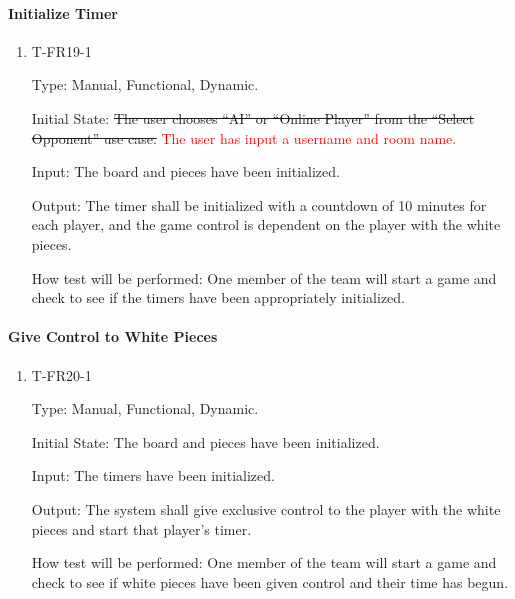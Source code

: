 \documentclass[12pt, titlepage]{article}
\begin{document}
    \paragraph{Initialize Timer}

        \begin{enumerate}

        \item{T-FR19-1\\}

            Type: Manual, Functional, Dynamic.
            					
            Initial State: \sout{The user chooses ``AI'' or ``Online Player'' from the ``Select Opponent'' use case.}
            \textcolor{red}{The user has input a username and room name.}
            
            Input: The board and pieces have been initialized.
            					
            Output: The timer shall be initialized with a countdown of 10 minutes for each player, and the game control is dependent on the player with the white pieces.

            How test will be performed: One member of the team will start a game and check to see if the timers have been appropriately initialized.

        \end{enumerate}

    \paragraph{Give Control to White Pieces}

        \begin{enumerate}

        \item{T-FR20-1\\}

            Type: Manual, Functional, Dynamic.
            					
            Initial State: The board and pieces have been initialized.
            					
            Input: The timers have been initialized.
            					
            Output: The system shall give exclusive control to the player with the white pieces and start that player’s timer.

            How test will be performed: One member of the team will start a game and check to see if white pieces have been given control and their time has begun.

        \end{enumerate}
\end{document}
